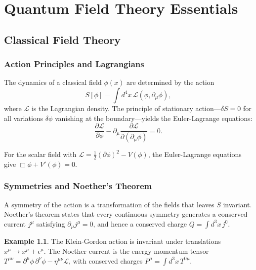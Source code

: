 \documentclass[12pt,a4paper,oneside]{book}
\theoremstyle{definition}
\newtheorem{example}{Example}[chapter]
\theoremstyle{plain}
\theoremstyle{remark}
\begin{document}
\part{Quantum Field Theory Essentials}

\chapter{Classical Field Theory}

\section{Action Principles and Lagrangians}

The dynamics of a classical field $\phi(x)$ are determined by the action
\begin{equation}
S[\phi] = \int d^4x\,\mathcal{L}(\phi, \partial_\mu\phi),
\end{equation}
where $\mathcal{L}$ is the Lagrangian density. The principle of stationary
action---$\delta S = 0$ for all variations $\delta\phi$ vanishing at the
boundary---yields the Euler-Lagrange equations:
\begin{equation}
\frac{\partial\mathcal{L}}{\partial\phi}
- \partial_\mu\frac{\partial\mathcal{L}}{\partial(\partial_\mu\phi)} = 0.
\end{equation}

For the scalar field with $\mathcal{L} = \frac{1}{2}(\partial\phi)^2 - V(\phi)$,
the Euler-Lagrange equations give $\Box\phi + V'(\phi) = 0$.

\section{Symmetries and Noether's Theorem}

A symmetry of the action is a transformation of the fields that leaves $S$
invariant. Noether's theorem states that every continuous symmetry generates
a conserved current $j^\mu$ satisfying $\partial_\mu j^\mu = 0$, and hence
a conserved charge $Q = \int d^3x\,j^0$.

\begin{example}
The Klein-Gordon action is invariant under translations $x^\mu \to x^\mu + \epsilon^\mu$.
The Noether current is the energy-momentum tensor
$T^{\mu\nu} = \partial^\mu\phi\,\partial^\nu\phi - \eta^{\mu\nu}\mathcal{L}$,
with conserved charges $P^\mu = \int d^3x\,T^{0\mu}$.
\end{example}
\end{document}
